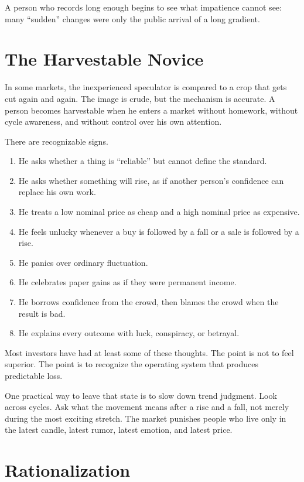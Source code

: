 A person who records long enough begins to see what impatience cannot see: many ``sudden'' changes were only the public arrival of a long gradient.

\section*{The Harvestable Novice}

In some markets, the inexperienced speculator is compared to a crop that gets cut again and again. The image is crude, but the mechanism is accurate. A person becomes harvestable when he enters a market without homework, without cycle awareness, and without control over his own attention.

There are recognizable signs.

\begin{enumerate}
\item He asks whether a thing is ``reliable'' but cannot define the standard.
\item He asks whether something will rise, as if another person's confidence can replace his own work.
\item He treats a low nominal price as cheap and a high nominal price as expensive.
\item He feels unlucky whenever a buy is followed by a fall or a sale is followed by a rise.
\item He panics over ordinary fluctuation.
\item He celebrates paper gains as if they were permanent income.
\item He borrows confidence from the crowd, then blames the crowd when the result is bad.
\item He explains every outcome with luck, conspiracy, or betrayal.
\end{enumerate}

Most investors have had at least some of these thoughts. The point is not to feel superior. The point is to recognize the operating system that produces predictable loss.

One practical way to leave that state is to slow down trend judgment. Look across cycles. Ask what the movement means after a rise and a fall, not merely during the most exciting stretch. The market punishes people who live only in the latest candle, latest rumor, latest emotion, and latest price.

\section*{Rationalization}

